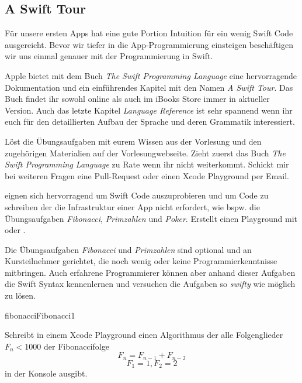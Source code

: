 \documentclass[parskip=half, final]{scrreprt}
\begin{document}
\begin{lecture}


\chapter{A Swift Tour}

Für unsere ersten Apps hat eine gute Portion Intuition für ein wenig Swift Code ausgereicht. Bevor wir tiefer in die App-Programmierung einsteigen beschäftigen wir uns einmal genauer mit der Programmierung in Swift.

Apple bietet mit dem Buch \emph{The Swift Programming Language} eine hervorragende Dokumentation und ein einführendes Kapitel mit den Namen \emph{A Swift Tour}. Das Buch findet ihr sowohl online  als auch im iBooks Store  immer in aktueller Version. Auch das letzte Kapitel \emph{Language Reference} ist sehr spannend wenn ihr euch für den detaillierten Aufbau der Sprache und deren Grammatik interessiert.

Löst die Übungsaufgaben mit eurem Wissen aus der Vorlesung und den zugehörigen Materialien auf der Vorlesungwebseite. Zieht zuerst das Buch \emph{The Swift Programming Language} zu Rate wenn ihr nicht weiterkommt. Schickt mir bei weiteren Fragen eine Pull-Request oder einen Xcode Playground per Email.

 eignen sich hervorragend um Swift Code auszuprobieren und um Code zu schreiben der die Infrastruktur einer App nicht erfordert, wie bspw. die Übungsaufgaben \emph{Fibonacci}, \emph{Primzahlen} und \emph{Poker}. Erstellt einen Playground mit  oder .

Die Übungsaufgaben \emph{Fibonacci} und \emph{Primzahlen} sind optional und an Kursteilnehmer gerichtet, die noch wenig oder keine Programmierkenntnisse mitbringen. Auch erfahrene Programmierer können aber anhand dieser Aufgaben die Swift Syntax kennenlernen und versuchen die Aufgaben so \emph{swifty} wie möglich zu lösen.

\begin{exc}

\begin{excitem*}{fibonacci}{Fibonacci}{1}

Schreibt in einem Xcode Playground einen Algorithmus der alle Folgenglieder $F_n < 1000$ der Fibonaccifolge
\begin{equation}
F_n = F_{n-1} + F_{n-2}
\end{equation}
\begin{equation}
F_1=1, F_2=2
\end{equation}
in der Konsole ausgibt.


\end{excitem*}
\end{exc}
\end{lecture}
\end{document}
